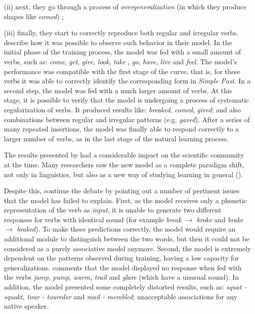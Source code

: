 (ii) next, they go through a process of \textit{overgeneralization} (in which they produce shapes like \textit{comed}) ;

(iii) finally, they start to correctly reproduce both regular and irregular verbs. \\


\cite{rumelhart:1986} describe how it was possible to observe such behavior in their model.
In the initial phase of the training process, the model was fed with a small amount of verbs, such as: \textit{come}, \textit{get}, \textit{give}, \textit {look}, \textit{take} , \textit{go}, \textit {have}, \textit {live} and \textit{feel}. The model's performance was compatible with the first stage of the curve, that is, for these verbs it was able to correctly identify the corresponding form in \textit{Simple Past}. In a second step, the model was fed with a much larger amount of verbs. At this stage, it is possible to verify that the model is undergoing a process of systematic regularization of verbs. It produced results like: \textit{breaked}, \textit{comed}, \textit{gived}; and also combinations between regular and irregular patterns (e.g. \textit{gaved}).
After a series of many repeated insertions, the model was finally able to respond correctly to a larger number of verbs, as in the last stage of the natural learning process.

The results presented by \cite{rumelhart:1986} had a considerable impact on the scientific community at the time. Many researchers saw the new model as a complete paradigm shift, not only in linguistics, but also as a new way of studying learning in general (\cite{Schneider1987}).

Despite this, \cite{Pinker:1988} continue the debate by pointing out a number of pertinent issues that the model has failed to explain. First, as the model receives only a phonetic representation of the verb as \textit{input}, it is unable to generate two different responses for verbs with identical sound (for example \textit{break} $ \rightarrow $ \textit{broke} and \textit{brake} $ \rightarrow $ \textit{braked}). To make these predictions correctly, the model would require an additional module to distinguish between the two words, but then it could not be considered as a purely associative model anymore. Second, the model is extremely dependent on the patterns observed during training, having a low capacity for generalizations. \cite{Pinker:1999} comments that the model displayed no response when fed with the verbs \textit{jump}, \textit{pump}, \textit {warm, trail} and \textit{glare} (which have a unusual sound). In addition, the model presented some completely distorted results, such as: \textit {squat - squakt, tour - toureder} and \textit{mail - membled}; unacceptable associations for any native speaker.

